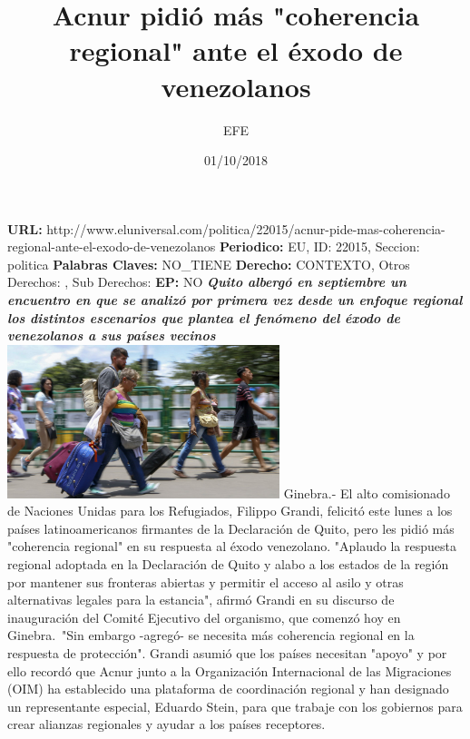 \documentclass{article}%
\title{\textbf{Acnur pidió más "coherencia regional" ante el éxodo de venezolanos}}%
\author{EFE}%
\date{01/10/2018}%
\begin{document}
%
\normalsize%
\maketitle%
\textbf{URL: }%
http://www.eluniversal.com/politica/22015/acnur{-}pide{-}mas{-}coherencia{-}regional{-}ante{-}el{-}exodo{-}de{-}venezolanos\newline%
%
\textbf{Periodico: }%
EU, %
ID: %
22015, %
Seccion: %
politica\newline%
%
\textbf{Palabras Claves: }%
NO\_TIENE\newline%
%
\textbf{Derecho: }%
CONTEXTO, %
Otros Derechos: %
, %
Sub Derechos: %
\newline%
%
\textbf{EP: }%
NO\newline%
\newline%
%
\textbf{\textit{Quito albergó en septiembre un encuentro en que se analizó por primera vez desde un enfoque regional los distintos escenarios que plantea el fenómeno del éxodo de venezolanos a sus países vecinos}}%
\newline%
\newline%
%
\includegraphics[width=300px]{183.jpg}%
\newline%
%
Ginebra.{-} El alto comisionado de Naciones Unidas para los Refugiados, Filippo Grandi, felicitó este lunes a los países latinoamericanos firmantes de la Declaración de Quito, pero les pidió más "coherencia regional" en su respuesta al éxodo venezolano.%
\newline%
%
"Aplaudo la respuesta regional adoptada en la Declaración de Quito y alabo a los estados de la región por mantener sus fronteras abiertas y permitir el acceso al asilo y otras alternativas legales para la estancia", afirmó Grandi en su discurso de inauguración del Comité Ejecutivo del organismo, que comenzó hoy en Ginebra.~"Sin embargo {-}agregó{-} se necesita más coherencia regional en la respuesta de protección".%
\newline%
%
Grandi asumió que los países necesitan "apoyo" y por ello recordó que Acnur junto a la Organización Internacional de las Migraciones (OIM) ha establecido una plataforma de coordinación regional y han designado un representante especial, Eduardo Stein, para que trabaje con los gobiernos para crear alianzas regionales y ayudar a los países receptores.%
\end{document}
